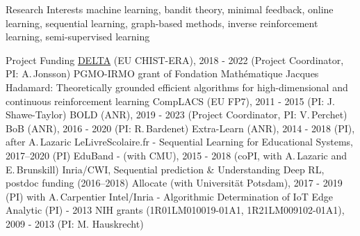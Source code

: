 \documentclass{resume}
\begin{document}

\begin{category}{Research Interests}
\citemnobullet machine learning, bandit theory, minimal feedback, 
online learning, sequential learning, graph-based methods, inverse 
reinforcement learning, semi-supervised learning
\end{category}


\begin{category}{Project Funding}
\citembullet \href{https://www.upf.edu/web/delta}{DELTA} (EU CHIST-ERA), 2018 - 2022  (Project Coordinator, PI: A.\,Jonsson)
\citembullet  PGMO-IRMO grant of Fondation Math\' ematique Jacques Hadamard: Theoretically grounded efficient algorithms for high-dimensional and continuous
reinforcement learning
\citembullet CompLACS (EU FP7), 2011 - 2015 (PI: J.\,Shawe-Taylor)
\citembullet BOLD (ANR), 2019 - 2023  (Project Coordinator, PI: V.\,Perchet)
\citembullet BoB (ANR), 2016 - 2020  (PI: R.\,Bardenet)
\citembullet Extra-Learn (ANR), 2014 - 2018  (PI), after A.\,Lazaric
\citembullet LeLivreScolaire.fr - Sequential Learning for Educational Systems, 2017--2020 (PI)
\citembullet EduBand - (with CMU), 2015 - 2018  (coPI, with A.\,Lazaric and E.\,Brunskill)  
\citembullet  Inria/CWI, Sequential prediction \& Understanding Deep RL, postdoc funding (2016--2018)
\citembullet Allocate (with Universit\"{a}t Potsdam), 2017 - 2019  (PI) with A.\,Carpentier  
\citembullet Intel/Inria - Algorithmic Determination of IoT Edge Analytic (PI) -
2013 
\citembullet NIH grants (1R01LM010019-01A1, 1R21LM009102-01A1), 2009 - 
2013 (PI: M. Hauskrecht)
\end{category}
\end{document}
